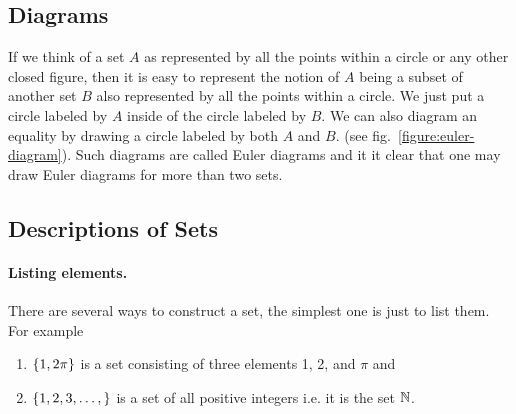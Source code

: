 \subsection{Diagrams}
If we think of a set $A$ as represented by all the points within a circle or
any other closed figure, then it is easy to represent the notion of $A$ being a
subset of another set $B$ also represented by all the points within a circle.
We just put a circle labeled by $A$ inside of the circle labeled by $B$. We can
also diagram an equality by drawing a circle labeled by both $A$ and $B$. (see
fig.~\ref{figure:euler-diagram}). Such diagrams are called Euler diagrams and
it it clear that one may draw Euler diagrams for more than two sets.
%


\subsection{Descriptions of Sets}

\paragraph{Listing elements.} There are several ways to construct a set, the
simplest one is just to list them. For example
\begin{enumerate}
  \item $\set{1, 2 \pi}$ is a set consisting of three elements 1, 2, and $\pi$
    and
  \item $\set{1, 2, 3, \dots, }$ is a set of all positive integers i.e. it is
    the set $\mathbb{N}$.
\end{enumerate}

